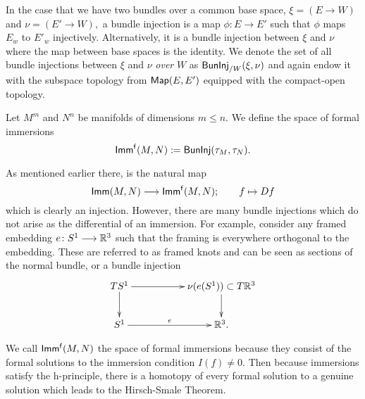 In the case that we have two bundles over a common base space, $\xi = (E \rightarrow W)$ and $\nu = (E' \rightarrow W),$ a bundle injection is a map $\phi: E \rightarrow E'$ such that $\phi$ maps $E_{w}$ to $E'_{w}$ injectively. Alternatively, it is a bundle injection between $\xi$ and $\nu$ where the map between base spaces is the identity. We denote the set of all bundle injections between $\xi$ and $\nu$ \textit{over} $W$ as ${\sf BunInj}_{/W}(\xi, \nu)$ and again endow it with the subspace topology from ${\sf Map}(E, E')$ equipped with the compact-open topology.

\begin{definition} \label{formalimmdef}
Let $M^{m}$ and $N^{n}$ be manifolds of dimensions $m \leq n.$ We define the space of formal immersions 
\[
{\sf Imm^{f}}(M, N) := {\sf BunInj}(\tau_{M}, \tau_{N}). 
\] 
\end{definition}
 As mentioned earlier there, is the natural map 
\begin{equation}\label{immintoform}
{\sf Imm}(M, N) \longrightarrow {\sf Imm^{f}}(M, N); \qquad f \mapsto Df
\end{equation}
which is clearly an injection. However, there are many bundle injections which do not arise as the differential of an immersion. For example, consider any framed embedding $e \colon S^{1} \longrightarrow \mathbb R^{3}$ such that the framing is everywhere orthogonal to the embedding. These are referred to as framed knots and can be seen as sections of the normal bundle, or a bundle injection
\[
\xymatrix{
TS^{1} \ar[rr]^-{} \ar[d]^-{}
&&
\nu(e(S^{1})) \subset T\RR^{3}  \ar[d]^-{}
\\
S^{1} \ar[rr]^-{e}
&&
\RR^{3}.
}
\]

We call ${\sf Imm^{f}}(M, N)$ the space of formal immersions because they consist of the formal solutions to the immersion condition $I(f) \neq 0$. Then because immersions satisfy the h-principle, there is a homotopy of every formal solution to a genuine solution which leads to the Hirsch-Smale Theorem.


